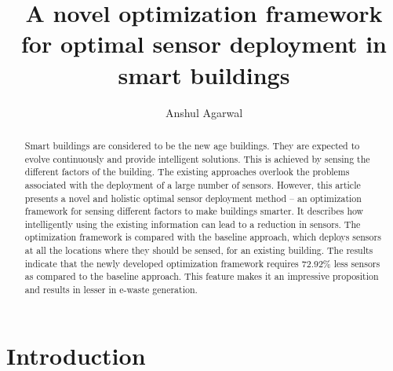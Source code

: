 \documentclass{article}
\begin{document}
\title{  A novel optimization framework for optimal sensor deployment in smart buildings }

\author{Anshul Agarwal}

\maketitle

\begin{abstract}
	Smart buildings are considered to be the new age buildings.
	They are expected to evolve continuously and provide intelligent solutions.
	This is achieved by sensing the different factors of the building.
	The existing approaches overlook the problems associated with the deployment of a large number of sensors.
	However, this article presents a novel and holistic optimal sensor deployment method -- an optimization framework for sensing different factors to make buildings smarter.
	It describes how intelligently using the existing information can lead to a reduction in sensors.
	The optimization framework is compared with the baseline approach, which deploys sensors at all the locations where they should be sensed, for an existing building.
	The results indicate that the newly developed optimization framework requires 72.92\% less sensors as compared to the baseline approach.
	This feature makes it an impressive proposition and results in lesser in e-waste generation. 
\end{abstract}

\section{Introduction}
\label{intro}
\end{document}
